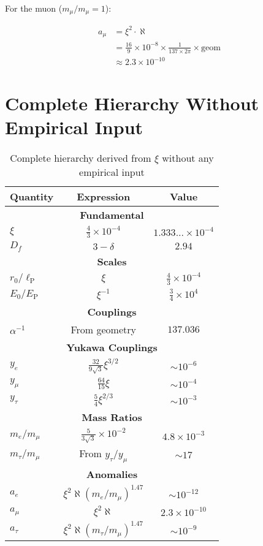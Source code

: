 \documentclass[12pt,a4paper]{article}
\newcommand{\lP}{\ell_{\text{P}}}
\newcommand{\EP}{E_{\text{P}}}
\newcommand{\rzero}{r_0}
\newcommand{\Ezero}{E_0}
\newcommand{\xipar}{\xi}  %
\begin{document}
	For the muon ($m_\mu/m_\mu = 1$):
	
	\begin{keyresult}
		\begin{align}
			a_\mu &= \xipar^2 \cdot \aleph \\
			&= \frac{16}{9} \times 10^{-8} \times \frac{1}{137 \times 2\pi} \times \text{geom} \\
			&\approx 2.3 \times 10^{-10}
		\end{align}
	\end{keyresult}
	
	\section{Complete Hierarchy Without Empirical Input}
	
	\begin{table}[h]
		\centering
		\begin{tabular}{lcc}
			\toprule
			\textbf{Quantity} & \textbf{Expression} & \textbf{Value} \\
			\midrule
			\multicolumn{3}{c}{\textbf{Fundamental}} \\
			$\xipar$ & $\frac{4}{3} \times 10^{-4}$ & $1.333... \times 10^{-4}$ \\
			$D_f$ & $3 - \delta$ & $2.94$ \\
			\midrule
			\multicolumn{3}{c}{\textbf{Scales}} \\
			$\rzero/\lP$ & $\xipar$ & $\frac{4}{3} \times 10^{-4}$ \\
			$\Ezero/\EP$ & $\xipar^{-1}$ & $\frac{3}{4} \times 10^{4}$ \\
			\midrule
			\multicolumn{3}{c}{\textbf{Couplings}} \\
			$\alpha^{-1}$ & From geometry & $137.036$ \\
			\midrule
			\multicolumn{3}{c}{\textbf{Yukawa Couplings}} \\
			$y_e$ & $\frac{32}{9\sqrt{3}} \xipar^{3/2}$ & $\sim 10^{-6}$ \\
			$y_\mu$ & $\frac{64}{15} \xipar$ & $\sim 10^{-4}$ \\
			$y_\tau$ & $\frac{5}{4} \xipar^{2/3}$ & $\sim 10^{-3}$ \\
			\midrule
			\multicolumn{3}{c}{\textbf{Mass Ratios}} \\
			$m_e/m_\mu$ & $\frac{5}{3\sqrt{3}} \times 10^{-2}$ & $4.8 \times 10^{-3}$ \\
			$m_\tau/m_\mu$ & From $y_\tau/y_\mu$ & $\sim 17$ \\
			\midrule
			\multicolumn{3}{c}{\textbf{Anomalies}} \\
			$a_e$ & $\xipar^2 \aleph (m_e/m_\mu)^{1.47}$ & $\sim 10^{-12}$ \\
			$a_\mu$ & $\xipar^2 \aleph$ & $2.3 \times 10^{-10}$ \\
			$a_\tau$ & $\xipar^2 \aleph (m_\tau/m_\mu)^{1.47}$ & $\sim 10^{-9}$ \\
			\bottomrule
		\end{tabular}
		\caption{Complete hierarchy derived from $\xipar$ without any empirical input}
	\end{table}
	
\end{document}
